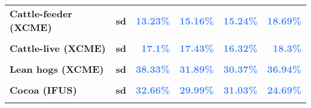 \documentclass[
  authoryear,
  preprint,
  3p]{elsarticle}
\begin{document}
\begin{longtable}[t]{>{}l>{}l>{}r>{}r>{}r>{}r}
\textbf{Cattle-feeder (XCME)} & \textbf{sd} & \textcolor[HTML]{4285f4}{\textbf{13.23\%}} & \textcolor[HTML]{4285f4}{\textbf{15.16\%}} & \textcolor[HTML]{4285f4}{\textbf{15.24\%}} & \textcolor[HTML]{4285f4}{\textbf{18.69\%}}\\
\textbf{\cellcolor{gray!10}{Cattle-live (XCME)}} & \textbf{\cellcolor{gray!10}{mean}} & \textcolor[HTML]{4285f4}{\textbf{\cellcolor{gray!10}{3.45\%}}} & \textcolor[HTML]{4285f4}{\textbf{\cellcolor{gray!10}{8.77\%}}} & \textcolor[HTML]{4285f4}{\textbf{\cellcolor{gray!10}{4.13\%}}} & \textcolor[HTML]{4285f4}{\textbf{\cellcolor{gray!10}{1.92\%}}}\\
\addlinespace
\textbf{Cattle-live (XCME)} & \textbf{sd} & \textcolor[HTML]{4285f4}{\textbf{17.1\%}} & \textcolor[HTML]{4285f4}{\textbf{17.43\%}} & \textcolor[HTML]{4285f4}{\textbf{16.32\%}} & \textcolor[HTML]{4285f4}{\textbf{18.3\%}}\\
\textbf{\cellcolor{gray!10}{Lean hogs (XCME)}} & \textbf{\cellcolor{gray!10}{mean}} & \textcolor[HTML]{4285f4}{\textbf{\cellcolor{gray!10}{0.73\%}}} & \textcolor[HTML]{4285f4}{\textbf{\cellcolor{gray!10}{8.4\%}}} & \textcolor[HTML]{4285f4}{\textbf{\cellcolor{gray!10}{12.69\%}}} & \textcolor[HTML]{4285f4}{\textbf{\cellcolor{gray!10}{-1.09\%}}}\\
\textbf{Lean hogs (XCME)} & \textbf{sd} & \textcolor[HTML]{4285f4}{\textbf{38.33\%}} & \textcolor[HTML]{4285f4}{\textbf{31.89\%}} & \textcolor[HTML]{4285f4}{\textbf{30.37\%}} & \textcolor[HTML]{4285f4}{\textbf{36.94\%}}\\
\textbf{\cellcolor{gray!10}{Cocoa (IFUS)}} & \textbf{\cellcolor{gray!10}{mean}} & \textcolor[HTML]{4285f4}{\textbf{\cellcolor{gray!10}{3.66\%}}} & \textcolor[HTML]{4285f4}{\textbf{\cellcolor{gray!10}{16.35\%}}} & \textcolor[HTML]{4285f4}{\textbf{\cellcolor{gray!10}{1.39\%}}} & \textcolor[HTML]{4285f4}{\textbf{\cellcolor{gray!10}{3.65\%}}}\\
\textbf{Cocoa (IFUS)} & \textbf{sd} & \textcolor[HTML]{4285f4}{\textbf{32.66\%}} & \textcolor[HTML]{4285f4}{\textbf{29.99\%}} & \textcolor[HTML]{4285f4}{\textbf{31.03\%}} & \textcolor[HTML]{4285f4}{\textbf{24.69\%}}\\
\addlinespace
\textbf{\cellcolor{gray!10}{Coffee-C (IFUS)}} & \textbf{\cellcolor{gray!10}{mean}} & \textcolor[HTML]{4285f4}{\textbf{\cellcolor{gray!10}{-5.91\%}}} & \textcolor[HTML]{4285f4}{\textbf{\cellcolor{gray!10}{20.38\%}}} & \textcolor[HTML]{4285f4}{\textbf{\cellcolor{gray!10}{2.2\%}}} & \textcolor[HTML]{4285f4}{\textbf{\cellcolor{gray!10}{1.99\%}}}\\

\end{longtable}
\end{document}
